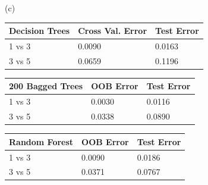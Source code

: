 \documentclass[12pt,letterpaper]{article}
\begin{document}
\begin{description}
	\item (c) 
\begin{table}[h]
\begin{tabular}{|l|l|l|l|}
\hline
\textbf{Decision Trees} & \multicolumn{2}{l|}{\textbf{Cross Val. Error}} & \textbf{Test Error} \\ \hline
1 vs 3                  & \multicolumn{2}{l|}{0.0090}                   & 0.0163             \\ \hline
3 vs 5                  & \multicolumn{2}{l|}{0.0659}                   & 0.1196	         \\ \hline
\end{tabular}
\end{table}
\begin{table}[h]
\begin{tabular}{|l|l|l|l|}
\hline
\textbf{200 Bagged Trees} & \multicolumn{2}{l|}{\textbf{OOB Error}} & \textbf{Test Error} \\ \hline
1 vs 3                    & \multicolumn{2}{l|}{0.0030}             & 0.0116              \\ \hline
3 vs 5                    & \multicolumn{2}{l|}{0.0338}             & 0.0890              \\ \hline
\end{tabular}
\end{table}
\begin{table}[h]
\begin{tabular}{|l|l|l|l|}
\hline
\textbf{Random Forest} & \multicolumn{2}{l|}{\textbf{OOB Error}} & \textbf{Test Error} \\ \hline
1 vs 3                    & \multicolumn{2}{l|}{0.0090}             & 0.0186              \\ \hline
3 vs 5                    & \multicolumn{2}{l|}{0.0371}             & 0.0767              \\ \hline
\end{tabular}
\end{table}

\end{description}
\end{document}
